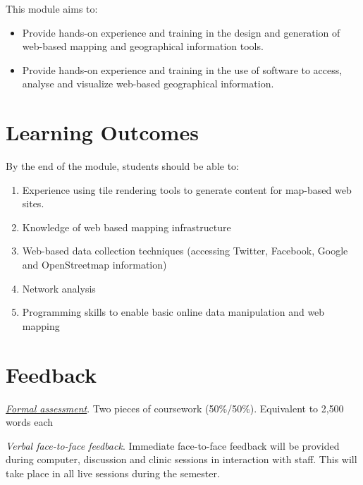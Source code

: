 \documentclass[
  letterpaper,
  DIV=11,
  numbers=noendperiod]{scrreprt}
\providecommand{\tightlist}{%
  \setlength{\itemsep}{0pt}\setlength{\parskip}{0pt}}\usepackage{longtable,booktabs,array}
\begin{document}

This module aims to:

\begin{itemize}
\tightlist
\item
  Provide hands-on experience and training in the design and generation
  of web-based mapping and geographical information tools.
\item
  Provide hands-on experience and training in the use of software to
  access, analyse and visualize web-based geographical information.
\end{itemize}

\hypertarget{learning-outcomes}{%
\section*{Learning Outcomes}\label{learning-outcomes}}


By the end of the module, students should be able to:

\begin{enumerate}
\def\labelenumi{(\arabic{enumi})}
\item
  Experience using tile rendering tools to generate content for
  map-based web sites.
\item
  Knowledge of web based mapping infrastructure
\item
  Web-based data collection techniques (accessing Twitter, Facebook,
  Google and OpenStreetmap information)
\item
  Network analysis
\item
  Programming skills to enable basic online data manipulation and web
  mapping
\end{enumerate}

\hypertarget{feedback}{%
\section*{Feedback}\label{feedback}}


\href{https://gdsl-ul.github.io/wma/assess.html}{\emph{Formal
assessment}}. Two pieces of coursework (50\%/50\%). Equivalent to 2,500
words each

\emph{Verbal face-to-face feedback}. Immediate face-to-face feedback
will be provided during computer, discussion and clinic sessions in
interaction with staff. This will take place in all live sessions during
the semester.
\end{document}
